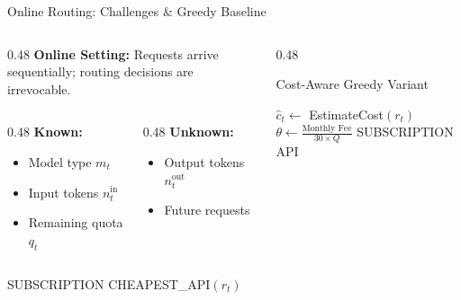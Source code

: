 \documentclass[aspectratio=169,10pt]{beamer}
\begin{document}
\begin{frame}{Online Routing: Challenges \& Greedy Baseline}
\begin{columns}[T]
\begin{column}{0.48\textwidth}
\textbf{Online Setting:} Requests arrive sequentially; routing decisions are \alert{irrevocable}.

\vspace{0.15cm}
\footnotesize
\begin{columns}[T]
\begin{column}{0.48\textwidth}
\textbf{Known:}
\begin{itemize}\setlength{\itemsep}{0pt}
    \item Model type $m_t$
    \item Input tokens $n_t^{\text{in}}$
    \item Remaining quota $q_t$
\end{itemize}
\end{column}
\begin{column}{0.48\textwidth}
\textbf{Unknown:}
\begin{itemize}\setlength{\itemsep}{0pt}
    \item \alert{Output tokens} $n_t^{\text{out}}$
    \item \alert{Future requests}
\end{itemize}
\end{column}
\end{columns}

\vspace{0.2cm}
\small
\begin{algorithm}[H]
\caption{\small Greedy Strategy}
\begin{algorithmic}[1]
\footnotesize
{}
    \RETURN SUBSCRIPTION
\ELSE
    \RETURN CHEAPEST\_API$(r_t)$
\ENDIF
\end{algorithmic}
\end{algorithm}
\end{column}

\begin{column}{0.48\textwidth}
\begin{exampleblock}{Cost-Aware Greedy Variant}
\footnotesize
\begin{algorithmic}[1]
\STATE $\hat{c}_t \gets$ EstimateCost$(r_t)$
\STATE $\theta \gets \frac{\text{Monthly Fee}}{30 \times Q}$
    \RETURN SUBSCRIPTION
\ELSE
    \RETURN API
\ENDIF
\end{algorithmic}
\end{exampleblock}


\end{column}
\end{columns}
\end{frame}
\end{document}
